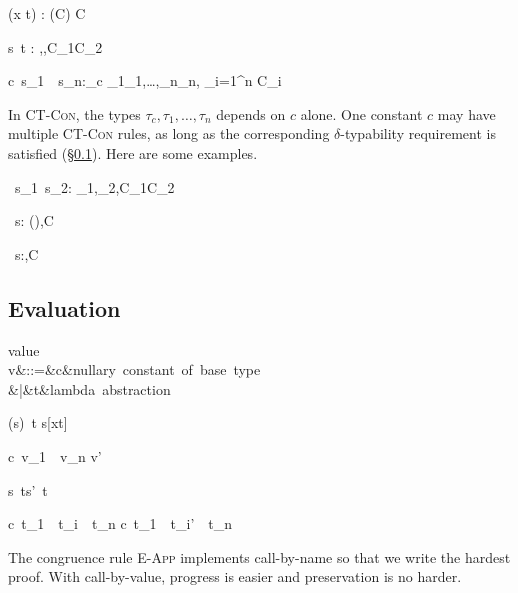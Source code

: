 \documentclass{amsart}
\theoremstyle{definition}
\begin{document}
{\Gamma\vdash (\Abs x t) :
(\sigma\R\tau\Given C) \Given C}

{\Gamma\vdash s~t : \beta \Given
\sigma\Sub\alpha\R\beta,\tau\Sub\alpha,C_1\cup C_2}

{\Gamma\vdash c~s_1~\cdots~s_n:\tau_c\Given
\sigma_1\Sub\tau_1,\ldots,\sigma_n\Sub\tau_n,
{\textstyle\bigcup_{i=1}^n C_i}
}

In \textsc{CT-Con}, the types $\tau_c,\tau_1,\ldots,\tau_n$
depends on $c$ alone. One constant $c$ may have multiple
\textsc{CT-Con} rules, as long as the corresponding
$\delta$-typability requirement is satisfied
(\S\ref{eval}). Here are some examples.

{\Gamma\vdash\Add~s_1~s_2:
\Int\Given\sigma_1\Sub\Int,\sigma_2\Sub\Int,C_1\cup C_2}

{\Gamma\vdash\If~s:
(\All\alpha\alpha\R\alpha\R\alpha)\Given\sigma\Sub\Bool,C}

{\Gamma\vdash\Fix~s:\alpha\Given\sigma\Sub \alpha\R\alpha,C}

\subsection{Evaluation}
\label{eval}

\begin{syntax}
\mbox{value}\\
v&::=&c&\mbox{nullary constant of base type}\\
&|&t&\mbox{lambda abstraction}
\end{syntax}

\infrule[$\beta$]
{}
{(s)~t \Red s[x\mapsto t]}

\infrule[$\delta$]
{}
{c~v_1~\cdots~v_n \Red v'}

{s~t\Red s'~t}

{c~t_1~\cdots~t_i~\cdots~t_n
\Red
c~t_1~\cdots~t_i'~\cdots~t_n
}

The congruence rule \textsc{E-App} implements call-by-name so
that we write the hardest proof. With call-by-value, progress is
easier and preservation is no harder.
\end{document}
